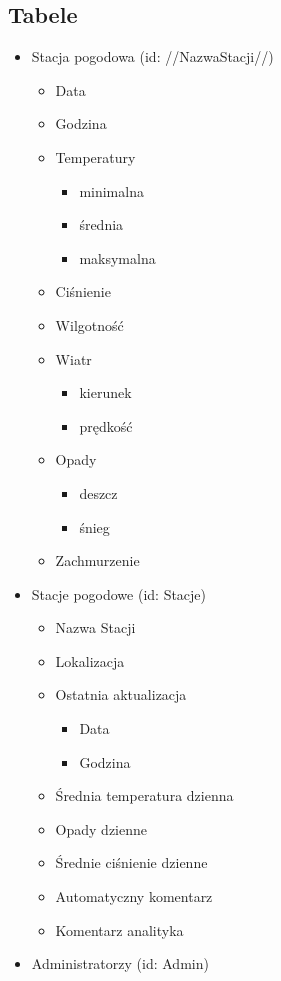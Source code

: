 \documentclass[12pt,a4paper]{article}
\begin{document}
\subsection{Tabele}
\begin{itemize}
\small
\item Stacja pogodowa (id: //NazwaStacji//)
	\begin{itemize}
	\item Data
	\item Godzina
	\item Temperatury
		\begin{itemize}
		\item minimalna
		\item średnia
		\item maksymalna
		\end{itemize}
	\item Ciśnienie
	\item Wilgotność
	\item Wiatr
		\begin{itemize}
		\item kierunek
		\item prędkość
		\end{itemize}
	\item Opady
		\begin{itemize}
		\item deszcz
		\item śnieg
		\end{itemize}
	\item Zachmurzenie
	\end{itemize}
\item Stacje pogodowe (id: Stacje)
	\begin{itemize}
	\item Nazwa Stacji
	\item Lokalizacja
	\item Ostatnia aktualizacja
		\begin{itemize}
		\item Data
		\item Godzina
		\end{itemize}
	\item Średnia temperatura dzienna
	\item Opady dzienne
	\item Średnie ciśnienie dzienne
	\item Automatyczny komentarz
	\item Komentarz analityka
	\end{itemize}
\item Administratorzy (id: Admin)

\end{itemize}
\end{document}
